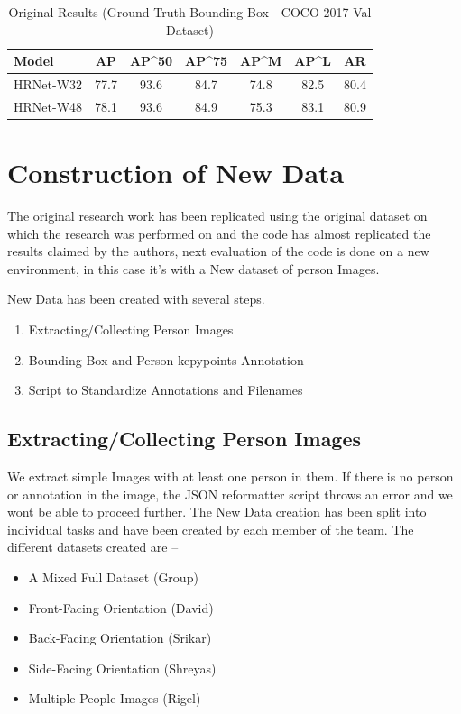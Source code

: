 \documentclass[a4paper,12pt]{article}
\begin{document}
\begin{table}[h]
\centering
\begin{tabular}{ l | c | c | c | c | c | c}
    Model & AP & AP^{50} & AP^{75} & AP^{M} & AP^{L} & AR \\
    \hline \hline
    HRNet-W32 & 77.7 & 93.6 & 84.7 & 74.8 & 82.5 & 80.4 \\
    HRNet-W48 & 78.1 & 93.6 & 84.9 & 75.3 & 83.1 & 80.9 \\
\end{tabular}
\caption{Original Results (Ground Truth Bounding Box - COCO 2017 Val Dataset)}
\label{tab:gt_original_results}
\end{table}

\section{Construction of New Data}
\label{marker}

The original research work has been replicated using the original dataset on which the research was performed on and the code has almost replicated the results claimed by the authors, next evaluation of the code is done on a new environment, in this case it’s with a New dataset of person Images. 

New Data has been created with several steps. 
\begin{enumerate}
\item	Extracting/Collecting Person Images
\item	Bounding Box and Person kepypoints Annotation
\item	Script to Standardize Annotations and Filenames
\end{enumerate}
\subsection{Extracting/Collecting Person Images}
We extract simple Images with at least one person in them. If there is no person or annotation in the image, the JSON reformatter script throws an error and we wont be able to proceed further.
The New Data creation has been split into individual tasks and have been created by each member of the team. The different datasets created are –
\begin{itemize}
\item	A Mixed Full Dataset (Group)
\item	Front-Facing Orientation (David)
\item	Back-Facing Orientation (Srikar)
\item	Side-Facing Orientation (Shreyas)
\item	Multiple People Images (Rigel)
\end{itemize}
\end{document}
